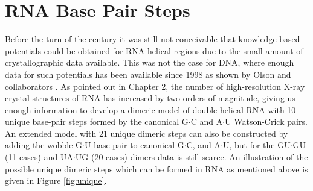 \chapter{RNA Base Pair Steps}
\label{basepairsteps} 

Before  the turn  of the  century it  was still  not  conceivable that
knowledge-based potentials  could be obtained for  RNA helical regions
due to the  small amount of crystallographic data  available. This was
not the case  for DNA, where enough data for  such potentials has been
available   since   1998  as   shown   by   Olson  and   collaborators
\cite{olson1998}.   As  pointed  out  in  Chapter  2,  the  number  of
high-resolution X-ray  crystal structures of RNA has  increased by two
orders of magnitude, giving us enough information to develop a dimeric
model of double-helical  RNA with 10 unique base-pair  steps formed by
the canonical G$\cdot$C and  A$\cdot$U Watson-Crick pairs. An extended
model with 21  unique dimeric steps can also  be constructed by adding
the wobble G$\cdot$U base-pair  to canonical G$\cdot$C, and A$\cdot$U,
but for the  GU$\cdot$GU (11 cases) and UA$\cdot$UG  (20 cases) dimers
data is still  scarce. An illustration of the  possible unique dimeric
steps which can be formed in RNA as mentioned above is given in Figure
\ref{fig:unique}.

